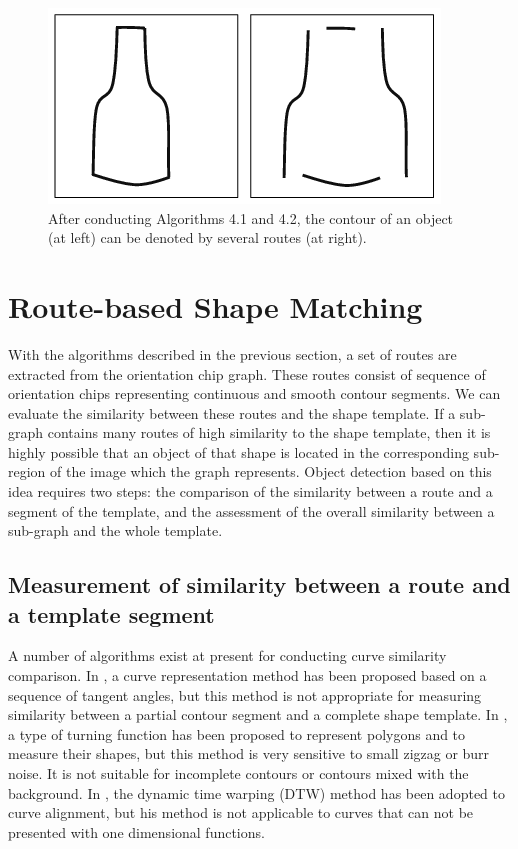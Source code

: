 \documentclass{article}
\begin{document}
\begin{figure}[!t]
\centering
\includegraphics[width=0.4\linewidth]{images/fig11.png}
\caption{After conducting Algorithms 4.1 and 4.2, 
the contour of an object (at left) can be denoted by several routes (at right).}
\label{fig:11}
\end{figure}

\section{Route-based Shape Matching}

With the algorithms described in the previous section,
a set of routes are extracted from the orientation chip graph.
These routes consist of sequence of orientation chips representing continuous and smooth contour segments.
We can evaluate the similarity between these routes and the shape template. 
If a sub-graph contains many routes of high similarity to the shape template,
then it is highly possible that an object of that shape is located in the corresponding sub-region of the image which the graph represents. 
Object detection based on this idea requires two steps: 
the comparison of the similarity between a route and a segment of the template, 
and the assessment of the overall similarity between a sub-graph and the whole template.

\subsection{Measurement of similarity between a route and a template segment}

A number of algorithms exist at present for conducting curve similarity comparison. 
In \cite{schindler2008}, a curve representation method has been proposed based on a sequence of tangent angles,
but this method is not appropriate for measuring similarity between a partial contour segment and a complete shape template.
In \cite{arkin1991}, a type of turning function has been proposed to represent polygons and to measure their shapes, 
but this method is very sensitive to small zigzag or burr noise.
It is not suitable for incomplete contours or contours mixed with the background. 
In \cite{wang1997}, the dynamic time warping (DTW) method has been adopted to curve alignment,
but his method is not applicable to curves that can not be presented with one dimensional functions.
\end{document}
